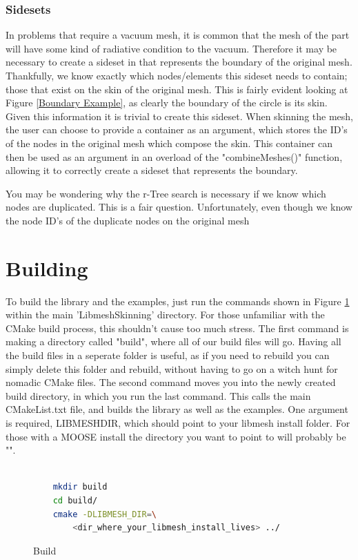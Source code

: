 \documentclass[12pt, letterpaper]{article}
\begin{document}
\subsubsection{Sidesets}
In problems that require a vacuum mesh, it is common that the mesh of the part will have some kind of radiative condition to the vacuum. Therefore it may be necessary to create a sideset in that represents the boundary of the original mesh. Thankfully, we know exactly which nodes/elements this sideset needs to contain; those that exist on the skin of the original mesh. This is fairly evident looking at Figure \ref{Boundary Example}, as clearly the boundary of the circle is its skin. Given this information it is trivial to create this sideset. When skinning the mesh, the user can choose to provide a container as an argument, which stores the ID's of the nodes in the original mesh which compose the skin. This container can then be used as an argument in an overload of the "combineMeshes()" function, allowing it to correctly create a sideset that represents the boundary.

You may be wondering why the r-Tree search is necessary if we know which nodes are duplicated. This is a fair question. Unfortunately, even though we know the node ID's of the duplicate nodes on the original mesh

\section{Building}
To build the library and the examples, just run the commands shown in Figure \ref{buildCommands} within the main 'Libmesh\textendash Skinning' directory. For those unfamiliar with the CMake build process, this shouldn't cause too much stress. The first command is making a directory called "build", where all of our build files will go. Having all the build files in a seperate folder is useful, as if you need to rebuild you can simply delete this folder and rebuild, without having to go on a witch hunt for nomadic CMake files. The second command moves you into the newly created build directory, in which you run the last command. This calls the main CMakeList.txt file, and builds the library as well as the examples. One argument is required, LIBMESH\textendash DIR, which should point to your libmesh install folder. For those with a MOOSE install the directory you want to point to will probably be "".

\begin{figure}[ht]
\begin{lstlisting}[language=bash]

	mkdir build
	cd build/
	cmake -DLIBMESH_DIR=\
		<dir_where_your_libmesh_install_lives> ../
\end{lstlisting}
\caption{Build}
\label{buildCommands}
\end{figure}
\end{document}
